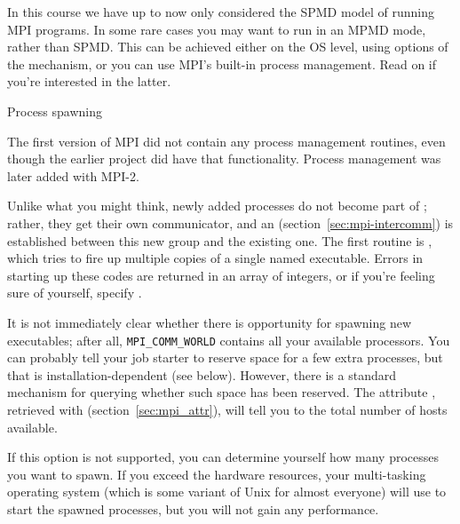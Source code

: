 
In this course we have up to now only considered the \ac{SPMD} model
of running MPI programs.  In some rare cases you may want to run in an
\ac{MPMD} mode, rather than \ac{SPMD}. This can be achieved either on
the \ac{OS} level, using options of the  mechanism,
or you can use MPI's built-in process management. Read on if you're
interested in the latter.

 {Process spawning}
\label{sec:mpi-dynamic}

The first version of MPI did not contain any process management
routines, even though the earlier  project did have
that functionality. Process management was later added with MPI-2.

Unlike what you might think, newly added processes do not become part
of ; rather, they get their own communicator, and an
 (section~\ref{sec:mpi-intercomm})
is established between this new group
and the existing one. The first routine is
, which tries to fire up multiple copies
of a single named executable. Errors in starting up these codes are returned in an array of integers, or
if you're feeling sure of yourself, specify .

It is not immediately clear whether there is opportunity for spawning
new executables; after all, \lstinline{MPI_COMM_WORLD} contains all
your available processors. You can probably tell your job starter to
reserve space for a few extra processes, but that is
installation-dependent (see below). However, there is a standard
mechanism for querying whether such space has been reserved.  The
attribute , retrieved with
 (section~\ref{sec:mpi_attr}), will tell
you to the total number of hosts available.

If this option is not supported, you can determine yourself how many
processes you want to spawn. If you exceed the hardware resources,
your multi-tasking operating system (which is some variant of Unix for
almost everyone) will use  to start the
spawned processes, but you will not gain any performance.

